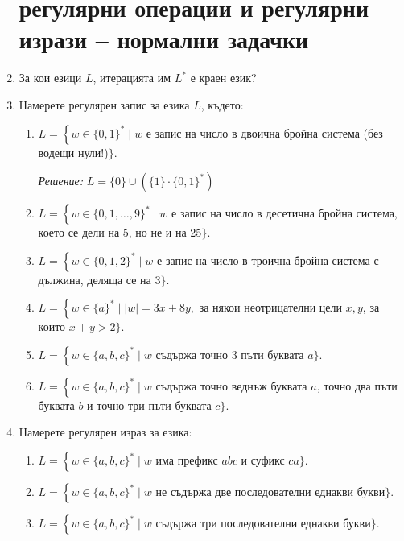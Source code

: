 \documentclass[a4paper]{scrartcl}
\newcommand{\langdef}[5] { %
    \ensuremath{#1 = \left\{ #2 \in \{#3\}^* \mid #4 \right.} #5\ensuremath{\}.} 
}
\begin{document}
\begin{enumerate} 

    \section*{регулярни операции и регулярни изрази -- нормални задачки}

    \item За кои езици $L$, итерацията им $L^*$ е краен език?

    \item Намерете регулярен запис за езика $L$, където: 
        \begin{enumerate} 
            \item \langdef{L}{w}{0,1}{w}{е запис на число в двоична бройна система (без водещи нули!)}
                \emph{Решение:} $L = \{0\} \cup \left(\{1\} \cdot \{0, 1\}^*\right)$

            \item \langdef{L}{w}{0,1, \dots, 9}{w}{е запис на число в десетична бройна система, което се дели на 5, но не и на 25}

            \item \langdef{L}{w}{0,1,2}{w}{е запис на число в троична бройна система с дължина, деляща се на 3}

            \item \langdef{L}{w}{a}{|w| = 3x + 8y,}{за някои неотрицателни цели $x, y$, за които $x + y > 2$}

            \item \langdef{L}{w}{a,b,c}{w}{съдържа точно 3 пъти буквата $a$}

            \item \langdef{L}{w}{a,b,c}{w}{съдържа точно веднъж буквата $a$, точно два пъти буквата $b$ и точно три пъти буквата $c$}
        \end{enumerate}

    \item Намерете регулярен израз за езика: 
    \begin{enumerate}
        \item \langdef{L}{w}{a,b,c}{w}{има префикс $abc$ и суфикс $ca$}

            \item \langdef{L}{w}{a,b,c}{w}{не съдържа две последователни еднакви букви}

            \item \langdef{L}{w}{a,b,c}{w}{съдържа три последователни еднакви букви}


\end{enumerate}
\end{enumerate}
\end{document}
